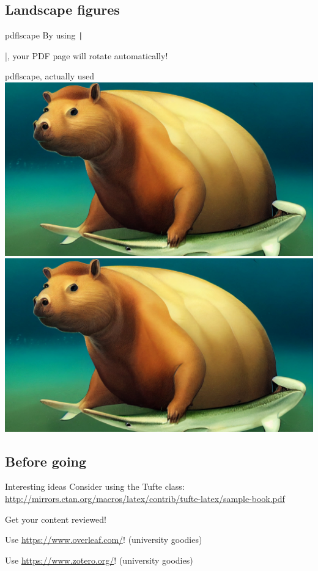 \documentclass[aspectratio=169]{beamer}
\begin{document}
	\subsection{Landscape figures}
	
	\begin{frame}{pdflscape}
		By using \texttt|\usepackage{pdflscape}|, your PDF page will rotate automatically!
	\end{frame}

	\begin{landscape}
		\begin{frame}{pdflscape, actually used}
			\centering
			\hspace{3cm}
			\includegraphics[width=.3\textwidth]{capybara_cropped}
			\includegraphics[width=2\textwidth]{capybara_cropped}
		\end{frame}
	\end{landscape}

	\subsection{Before going}
	
	\begin{frame}{Interesting ideas}
		Consider using the Tufte class: \url{http://mirrors.ctan.org/macros/latex/contrib/tufte-latex/sample-book.pdf}
	\end{frame}

	\begin{frame}
		\centering
		Get your content reviewed!
		
		Use \url{https://www.overleaf.com/}! {\small (university goodies)}
		
		Use \url{https://www.zotero.org/}! {\small (university goodies)}
	\end{frame}
\end{document}
